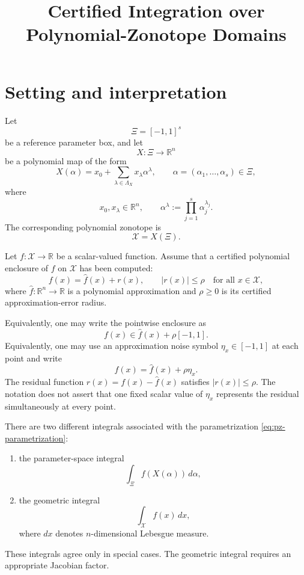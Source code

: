 \documentclass[11pt]{article}
\title{Certified Integration over Polynomial-Zonotope Domains}
\author{}
\date{}
\newcommand{\R}{\mathbb{R}}
\newcommand{\abs}[1]{\left\lvert #1\right\rvert}
\begin{document}
\maketitle

\section{Setting and interpretation}
\label{sec:pz-integration}

Let
\[
\Xi=[-1,1]^s
\]
be a reference parameter box, and let
\[
X:\Xi\to\R^n
\]
be a polynomial map of the form
\begin{equation}
    X(\alpha)
    =
    x_0+\sum_{\lambda\in\Lambda_X} x_\lambda \alpha^\lambda,
    \qquad
    \alpha=(\alpha_1,\ldots,\alpha_s)\in\Xi,
    \label{eq:pz-parametrization}
\end{equation}
where
\[
    x_0,x_\lambda\in\R^n,
    \qquad
    \alpha^\lambda
    :=
    \prod_{j=1}^s \alpha_j^{\lambda_j}.
\]
The corresponding polynomial zonotope is
\[
    \mathcal{X}=X(\Xi).
\]

Let \(f:\mathcal{X}\to\R\) be a scalar-valued function. Assume that a certified polynomial enclosure of \(f\) on \(\mathcal{X}\) has been computed:
\begin{equation}
    f(x)=\widehat f(x)+r(x),
    \qquad
    \abs{r(x)}\leq \rho
    \quad\text{for all }x\in\mathcal{X},
    \label{eq:polynomial-remainder-enclosure}
\end{equation}
where \(\widehat f:\R^n\to\R\) is a polynomial approximation and
\(\rho\geq0\) is its certified approximation-error radius.

Equivalently, one may write the pointwise enclosure as
\begin{equation}
    f(x)\in \widehat f(x)+\rho[-1,1].
    \label{eq:pointwise-noise}
\end{equation}
Equivalently, one may use an approximation noise symbol \(\eta_x\in[-1,1]\)
at each point and write
\[
    f(x)=\widehat f(x)+\rho\eta_x.
\]
The residual function \(r(x)=f(x)-\widehat f(x)\) satisfies
\(\abs{r(x)}\leq\rho\).  The notation does not assert that one fixed scalar
value of \(\eta_x\) represents the residual simultaneously at every point.

There are two different integrals associated with the parametrization \eqref{eq:pz-parametrization}:
\begin{enumerate}[label=\arabic*.]
    \item the parameter-space integral
    \[
        \int_\Xi f(X(\alpha))\,d\alpha,
    \]
    \item the geometric integral
    \[
        \int_{\mathcal{X}} f(x)\,dx,
    \]
    where \(dx\) denotes \(n\)-dimensional Lebesgue measure.
\end{enumerate}
These integrals agree only in special cases. The geometric integral requires an appropriate Jacobian factor.
\end{document}
